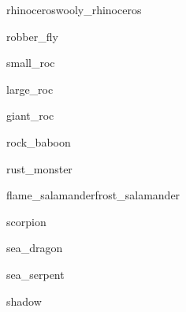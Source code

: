 \documentclass[letterpaper,serif]{module}
\begin{document}

\begin{newmonster2}{rhinoceros}{wooly_rhinoceros}\end{newmonster2}

\begin{newmonster}{robber_fly}\end{newmonster}


\begin{newmonster}{small_roc}\end{newmonster}

\begin{newmonster}{large_roc}\end{newmonster}

\begin{newmonster}{giant_roc}\end{newmonster}

\begin{newmonster}{rock_baboon}\end{newmonster}

\begin{newmonster}{rust_monster}\end{newmonster}


\begin{newmonster2}{flame_salamander}{frost_salamander}\end{newmonster2}

\begin{newmonster}{scorpion}\end{newmonster}

\begin{newmonster}{sea_dragon}\end{newmonster}

\begin{newmonster}{sea_serpent}\end{newmonster}

\begin{newmonster}{shadow}\end{newmonster}
\end{document}
